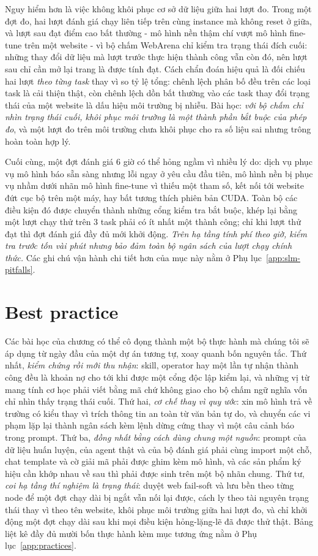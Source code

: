 Nguy hiểm hơn là việc không khôi phục cơ sở dữ liệu giữa hai lượt đo. Trong một
đợt đo, hai lượt đánh giá chạy liên tiếp trên cùng instance mà không reset ở
giữa, và lượt sau đạt điểm cao bất thường - mô hình nền thậm chí vượt mô hình
fine-tune trên một website - vì bộ chấm WebArena chỉ kiểm tra trạng thái đích
cuối: những thay đổi dữ liệu mà lượt trước thực hiện thành công vẫn còn đó, nên
lượt sau chỉ cần mở lại trang là được tính đạt. Cách chẩn đoán hiệu quả là đối
chiếu hai lượt \emph{theo từng task} thay vì so tỷ lệ tổng: chênh lệch phân bố
đều trên các loại task là cải thiện thật, còn chênh lệch dồn bất thường vào các
task thay đổi trạng thái của một website là dấu hiệu môi trường bị nhiễu. Bài
học: \emph{với bộ chấm chỉ nhìn trạng thái cuối, khôi phục môi trường là một
thành phần bắt buộc của phép đo}, và một lượt đo trên môi trường chưa khôi phục
cho ra số liệu sai nhưng trông hoàn toàn hợp lý.

Cuối cùng, một đợt đánh giá 6 giờ có thể hỏng ngầm vì nhiều lý do: dịch vụ phục
vụ mô hình báo sẵn sàng nhưng lỗi ngay ở yêu cầu đầu tiên, mô hình nền bị phục
vụ nhầm dưới nhãn mô hình fine-tune vì thiếu một tham số, kết nối tới website
đứt cục bộ trên một máy, hay bất tương thích phiên bản CUDA. Toàn bộ các điều
kiện đó được chuyển thành những cổng kiểm tra bắt buộc, khép lại bằng một lượt
chạy thử trên 3 task phải có ít nhất một thành công; chỉ khi lượt thử đạt thì
đợt đánh giá đầy đủ mới khởi động. \emph{Trên hạ tầng tính phí theo giờ, kiểm
tra trước tốn vài phút nhưng bảo đảm toàn bộ ngân sách của lượt chạy chính
thức.} Các ghi chú vận hành chi tiết hơn của mục này nằm ở
Phụ lục~\ref{app:slm-pitfalls}.

\section{Best practice}
\label{sec:disc-practices}

Các bài học của chương có thể cô đọng thành một bộ thực hành mà chúng tôi sẽ
áp dụng từ ngày đầu của một dự án tương tự, xoay quanh bốn nguyên tắc. Thứ
nhất, \emph{kiểm chứng rồi mới thu nhận}: skill, operator hay một lần tự nhận
thành công đều là khoản nợ cho tới khi được một cổng độc lập kiểm lại, và
những vị từ mang tính cơ học phải viết bằng mã chứ không giao cho bộ chấm ngữ
nghĩa vốn chỉ nhìn thấy trạng thái cuối. Thứ hai, \emph{cơ chế thay vì quy
ước}: xin mô hình trả về trường có kiểu thay vì trích thông tin an toàn từ văn
bản tự do, và chuyển các vi phạm lặp lại thành ngân sách kèm lệnh dừng cứng
thay vì một câu cảnh báo trong prompt. Thứ ba, \emph{đồng nhất bằng cách dùng
chung một nguồn}: prompt của dữ liệu huấn luyện, của agent thật và của bộ đánh
giá phải cùng import một chỗ, chat template và cờ giải mã phải được ghim kèm
mô hình, và các sản phẩm ký hiệu cần khớp nhau về sau thì phải được sinh trên
một bộ nhãn chung. Thứ tư, \emph{coi hạ tầng thí nghiệm là trạng thái}: duyệt
web fail-soft và lưu bền theo từng node để một đợt chạy dài bị ngắt vẫn nối
lại được, cách ly theo tài nguyên trạng thái thay vì theo tên website, khôi
phục môi trường giữa hai lượt đo, và chỉ khởi động một đợt chạy dài sau khi mọi
điều kiện hỏng-lặng-lẽ đã được thử thật. Bảng liệt kê đầy đủ mười bốn thực
hành kèm mục tương ứng nằm ở Phụ lục~\ref{app:practices}.
